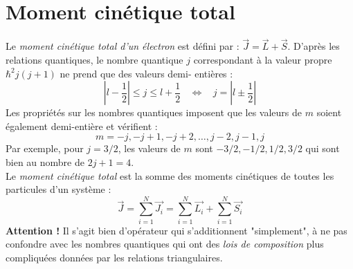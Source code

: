 \documentclass[british,french,11pt, a4paper, openany]{book}
\begin{document}
\section{Moment cinétique total}
Le \textit{moment cinétique total d'un électron} est défini par : $\vec{J} = 
\vec{L}+\vec{S}$. D'après les relations quantiques, le nombre quantique $j$ 
correspondant à la valeur propre $\hbar^2j(j+1)$ ne prend que des valeurs demi-
entières :
\begin{equation}
	\left|l-\frac{1}{2}\right| \leq j \leq l+\frac{1}{2}\ \ \ \ \Leftrightarrow\ \ \ \
	j = \left|l\pm\frac{1}{2}\right|
\end{equation}
Les propriétés sur les nombres quantiques imposent que les valeurs de $m$ soient
également demi-entière et vérifient :
\begin{equation}
	m = -j, -j+1, -j+2, \dots, j-2,j-1,j
\end{equation}
Par exemple, pour $j=3/2$, les valeurs de $m$ sont $-3/2,-1/2,1/2,3/2$ qui sont 
bien au nombre de $2j+1=4$.\\

Le \textit{moment cinétique total} est la somme des moments cinétiques de toutes 
les particules d'un système :
\begin{equation}
	\vec{J} = \sum_{i=1}^N\vec{J_i} = \sum_{i=1}^N \vec{L_i} + \sum_{i=1}^N \vec{S_i}
\end{equation}
\textbf{Attention !} Il s'agit bien d'opérateur qui s'additionnent "simplement", à 
ne pas confondre avec les nombres quantiques qui ont des \textit{lois de composition} 
plus compliquées données par les relations triangulaires.
\end{document}
